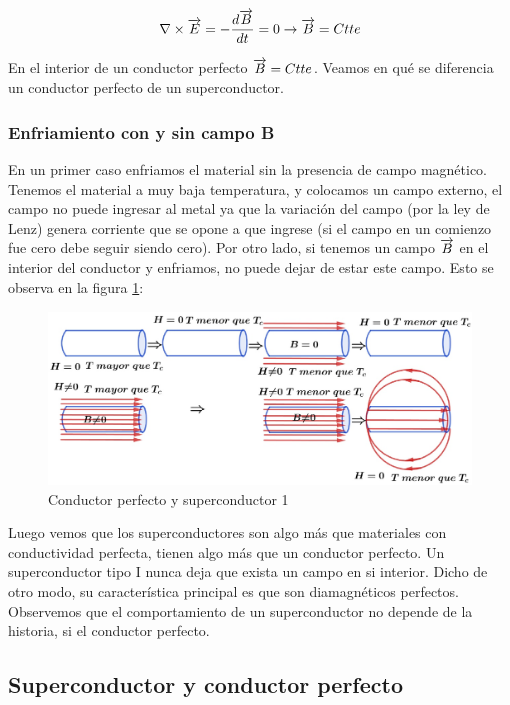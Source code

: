 \begin{equation}
	\nabla \times \overrightarrow{E}= -\frac{d\overrightarrow{B}}{dt} = 0 \rightarrow \overrightarrow{B} = Ctte
\end{equation}

En el interior de un conductor perfecto $\overrightarrow{B} = Ctte$. Veamos en qué se diferencia un conductor perfecto de un superconductor.

\subsubsection{Enfriamiento con y sin campo B}

En un primer caso enfriamos el material sin la presencia de campo magnético. Tenemos el material a muy baja temperatura, y colocamos un campo externo, el campo no puede ingresar al metal ya que la variación del campo (por la ley de Lenz) genera corriente que se opone a que ingrese (si el campo en un comienzo fue cero debe seguir siendo cero). Por otro lado, si tenemos un campo $\overrightarrow{B}$ en el interior del conductor y enfriamos, no puede dejar de estar este campo. Esto se observa en la figura \ref{fig:416}:

\begin{figure}[H]
    \centering
    \includegraphics[width=1.0\textwidth]{./Figures/fig416}
    \caption{Conductor perfecto y superconductor 1}
	\label{fig:416}
\end{figure}

Luego vemos que los superconductores son algo más que materiales con conductividad perfecta, tienen algo más que un conductor perfecto. Un superconductor tipo I nunca deja que exista un campo en si interior. Dicho de otro modo, su característica principal es que son diamagnéticos perfectos. Observemos que el comportamiento de un superconductor no depende de la historia, si el conductor perfecto.

\subsection{Superconductor y conductor perfecto}

